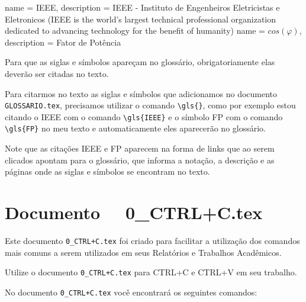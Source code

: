 \pagebreak

\begin{Codigo}[language=tex, caption=Biblioteca de Glossários~ {\bf GLOSSARIO.tex}, label=cod:Glo2]
    {
    name = {IEEE},
    description = {IEEE - Instituto de Engenheiros
    Eletricistas e Eletronicos (IEEE is the world's 
    largest technical professional organization 
    dedicated to advancing technology for the benefit 
    of humanity)}
    }
    {
    name = {$cos(\varphi)$},
    description = {Fator de Potência}
    }
\end{Codigo}

\begin{CaixaVermelha}
    Para que as siglas e símbolos apareçam no glossário, obrigatoriamente elas deverão ser citadas no texto.
\end{CaixaVermelha}

Para citarmos no texto as siglas e símbolos que adicionamos no documento \verb|GLOSSARIO.tex|, precisamos utilizar o comando \verb|\gls{}|, como por exemplo estou citando o \gls{IEEE} com o comando \verb|\gls{IEEE}| e o símbolo \gls{FP} com o comando \verb|\gls{FP}| no meu texto e automaticamente eles aparecerão no glossário. 

Note que as citações \gls{IEEE} e \gls{FP} aparecem na forma de links que ao serem clicados apontam para o glossário, que informa a notação, a descrição e as páginas onde as siglas e símbolos se encontram no texto.


\pagebreak

\section{Documento ~~0\_CTRL+C.tex}

Este documento \verb|0_CTRL+C.tex| foi criado para facilitar a utilização dos comandos mais comuns a serem utilizados em seus Relatórios e Trabalhos Acadêmicos.

Utilize o documento \verb|0_CTRL+C.tex| para CTRL+C e CTRL+V em seu trabalho.

No documento \verb|0_CTRL+C.tex| você encontrará os seguintes comandos:


